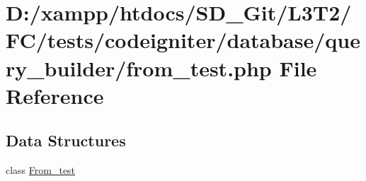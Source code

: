 \hypertarget{tests_2codeigniter_2database_2query__builder_2from__test_8php}{}\section{D\+:/xampp/htdocs/\+S\+D\+\_\+\+Git/\+L3\+T2/\+F\+C/tests/codeigniter/database/query\+\_\+builder/from\+\_\+test.php File Reference}
\label{tests_2codeigniter_2database_2query__builder_2from__test_8php}
\subsection*{Data Structures}
\begin{DoxyCompactItemize}
\item 
class \hyperlink{class_from__test}{From\+\_\+test}
\end{DoxyCompactItemize}
